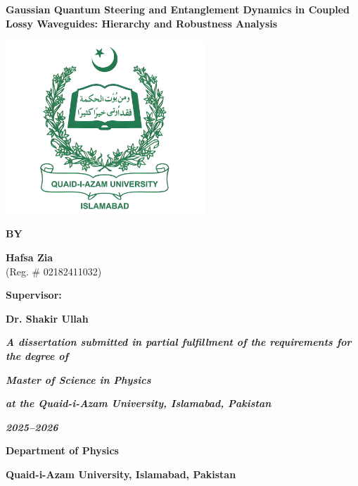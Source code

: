 \documentclass[12pt,a4paper]{report}
\begin{document}
\newpage
\begin{titlepage}
	\centering

	{\LARGE \textbf{Gaussian Quantum Steering and Entanglement Dynamics in Coupled Lossy Waveguides: Hierarchy and Robustness Analysis} \par}
	\vspace{0.4cm}

	\includegraphics[width=7.5cm]{QAU_enhanced_Logo}
	\vspace{0.4cm}

	{\large \textbf{BY} \par}
	{\Large \textbf{Hafsa Zia} \\}
	{\centering\large (Reg. \# {02182411032})}
	\vspace{0.4cm}

	{\large \textbf{Supervisor:} \\}
	{\Large \textbf{Dr. Shakir Ullah} \par}

	\vspace{0.4cm}
	\begin{spacing}{1.2}
		{\textbf{\textit{A dissertation submitted in partial fulfillment of the requirements for the degree of}}}
		{\Large \textit{\textbf{Master of Science in Physics}} \par}
		{\textbf{\textit{at the Quaid-i-Azam University, Islamabad, Pakistan}} \par}
		{\textbf{\textit{2025--2026}} \par}
	\end{spacing}
		\vspace{1cm}
	{\Large\textbf{Department of Physics} \\}
	{\textbf{Quaid-i-Azam University, Islamabad, Pakistan} \par}

\end{titlepage}
\end{document}
